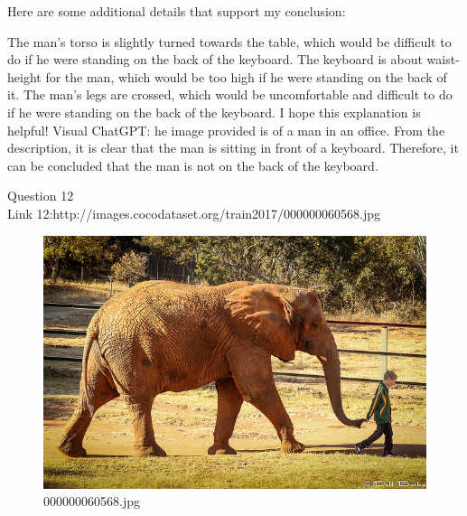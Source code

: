 \begin{enumerate}
        Here are some additional details that support my conclusion:
        
        The man's torso is slightly turned towards the table, which would be difficult to do if he were standing on the back of the keyboard.
        The keyboard is about waist-height for the man, which would be too high if he were standing on the back of it.
        The man's legs are crossed, which would be uncomfortable and difficult to do if he were standing on the back of the keyboard.
        I hope this explanation is helpful!
        \subitem Visual ChatGPT: he image provided is of a man in an office. From the description, it is clear that the man is sitting in front of a keyboard. Therefore, it can be concluded that the man is not on the back of the keyboard.
    \end{enumerate}
Question 12\\
Link 12:http://images.cocodataset.org/train2017/000000060568.jpg
    \begin{figure}[h]
        \centering
        \includegraphics[width=0.8\linewidth]{../image set/easy/000000060568.jpg}
        \caption{000000060568.jpg}
    \end{figure}
